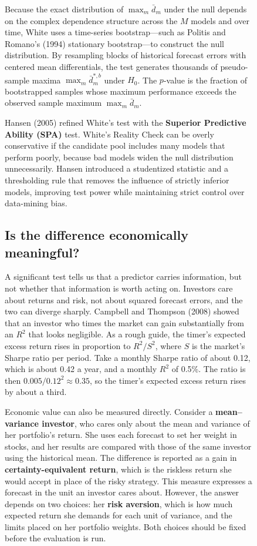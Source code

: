 \begin{figure}[htbp]
Because the exact distribution of $\max_m \bar{d}_m$ under the null depends on the complex dependence structure across the $M$ models and over time, White uses a time-series bootstrap---such as Politis and Romano's (1994) stationary bootstrap---to construct the null distribution. By resampling blocks of historical forecast errors with centered mean differentials, the test generates thousands of pseudo-sample maxima $\max_m \bar{d}_m^{*,b}$ under $H_0$. The $p$-value is the fraction of bootstrapped samples whose maximum performance exceeds the observed sample maximum $\max_m \bar{d}_m$.

Hansen (2005) refined White's test with the \textbf{Superior Predictive Ability (SPA)} test. White's Reality Check can be overly conservative if the candidate pool includes many models that perform poorly, because bad models widen the null distribution unnecessarily. Hansen introduced a studentized statistic and a thresholding rule that removes the influence of strictly inferior models, improving test power while maintaining strict control over data-mining bias.

\subsection{Is the difference economically meaningful?}

A significant test tells us that a predictor carries information, but not whether that information is worth acting on. Investors care about returns and risk, not about squared forecast errors, and the two can diverge sharply. Campbell and Thompson (2008) showed that an investor who times the market can gain substantially from an $R^2$ that looks negligible. As a rough guide, the timer's expected excess return rises in proportion to $R^2/S^2$, where $S$ is the market's Sharpe ratio per period. Take a monthly Sharpe ratio of about 0.12, which is about 0.42 a year, and a monthly $R^2$ of 0.5\%. The ratio is then $0.005/0.12^2 \approx 0.35$, so the timer's expected excess return rises by about a third.

Economic value can also be measured directly. Consider a \textbf{mean--variance investor}, who cares only about the mean and variance of her portfolio's return. She uses each forecast to set her weight in stocks, and her results are compared with those of the same investor using the historical mean. The difference is reported as a gain in \textbf{certainty-equivalent return}, which is the riskless return she would accept in place of the risky strategy. This measure expresses a forecast in the unit an investor cares about. However, the answer depends on two choices: her \textbf{risk aversion}, which is how much expected return she demands for each unit of variance, and the limits placed on her portfolio weights. Both choices should be fixed before the evaluation is run.


\end{figure}
